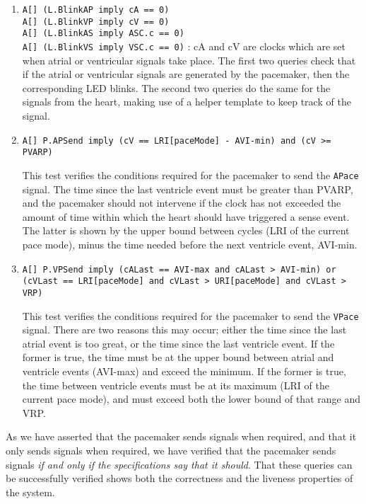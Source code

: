 \documentclass[a4paper]{article}
\begin{document}
\begin{enumerate}
\item {\tt A[] (L.BlinkAP imply cA == 0)} \\
      {\tt A[] (L.BlinkVP imply cV == 0)} \\
      {\tt A[] (L.BlinkAS imply ASC.c == 0)} \\
      {\tt A[] (L.BlinkVS imply VSC.c == 0)} : cA and cV are clocks which are set when atrial or ventricular signals take place. The first two queries check that if the atrial or ventricular signals are generated by the pacemaker, then the corresponding  LED blinks.  The second two queries do the same for the signals from the heart, making use of a helper template to keep track of the signal.

\item {\tt A[] P.APSend imply (cV == LRI[paceMode] - AVI-min) and (cV >= PVARP)}

This test verifies the conditions required for the pacemaker to send the {\tt APace} signal.  The time since the last ventricle event must be greater than PVARP, and the pacemaker should not intervene if the clock has not exceeded the amount of time within which the heart should have triggered a sense event.  The latter is shown by the upper bound between cycles (LRI of the current pace mode), minus the time needed before the next ventricle event, AVI-min.

\item {\tt A[] P.VPSend imply (cALast == AVI-max and cALast > AVI-min) or (cVLast == LRI[paceMode] and cVLast > URI[paceMode] and cVLast > VRP)}

This test verifies the conditions required for the pacemaker to send the {\tt VPace} signal.  There are two reasons this may occur; either the time since the last atrial event is too great, or the time since the last ventricle event.  If the former is true, the time must be at the upper bound between atrial and ventricle events (AVI-max) and exceed the minimum.  If the former is true, the time between ventricle events must be at its maximum (LRI of the current pace mode), and must exceed both the lower bound of that range and VRP.

\end{enumerate}

As we have asserted that the pacemaker sends signals when required, and that it only sends signals when required, we have verified that the pacemaker sends signals {\it if and only if the specifications say that it should}.  That these queries can be successfully verified shows both the correctness and the liveness properties of the system.
\end{document}
